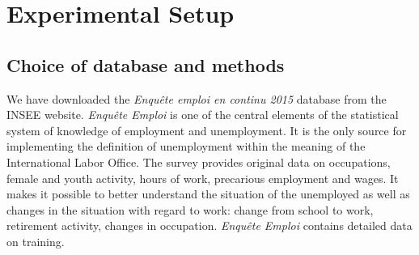 \chapter{Experimental Setup}

\section{Choice of database and methods}
We have downloaded the \textit{Enqu\^ete emploi en continu 2015} database from the INSEE website.
\textit{Enqu\^ete Emploi} is one of the central elements of the statistical system of knowledge of
employment and unemployment. It is the only source for implementing the definition of unemployment
within the meaning of the International Labor Office. The survey provides original data on
occupations, female and youth activity, hours of work, precarious employment and wages. It makes it
possible to better understand the situation of the unemployed as well as changes in the situation
with regard to work: change from school to work, retirement activity, changes in occupation.
\textit{Enqu\^ete Emploi} contains detailed data on training.
